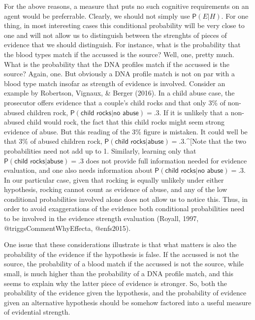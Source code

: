 \documentclass[10pt,dvipsnames,enabledeprecatedfontcommands]{scrartcl}
\newcommand{\pr}[1]{\mathsf{P}(#1)}
\begin{document}
For the above reasons, a measure that puts no such cognitive
requirements on an agent would be preferrable. Clearly, we should not
simply use \(\pr{E\vert H}\). For one thing, in most interesting cases
this conditional probability will be very close to one and will not
allow us to distinguish between the strenghts of pieces of evidence that
we should distinguish. For instance, what is the probability that the
blood types match if the accussed is the source? Well, one, pretty much.
What is the probability that the DNA profiles match if the accussed is
the source? Again, one. But obviously a DNA profile match is not on par
with a blood type match insofar as strength of evidence is involved.
Consider an example by Robertson, Vignaux, \& Berger (2016). In a child
abuse case, the prosecutor offers evidence that a couple's child rocks
and that only 3\% of non-abused children rock,
\(\pr{\textsf{child rocks} \vert \textsf{no abuse}}=.3\). If it is
unlikely that a non-abused child would rock, the fact that this child
rocks might seem strong evidence of abuse. But this reading of the 3\%
figure is mistaken. It could well be that 3\% of abused children rock,
\(\pr{\textsf{child rocks} \vert \textsf{abuse}}=.3\).\^{}{[}Note that
the two probabilities need not add up to 1. Similarly, learning only
that \(\pr{\textsf{child rocks} \vert \textsf{abuse}}=.3\) does not
provide full information needed for evidence evaluation, and one also
needs information about
\(\pr{\textsf{child rocks} \vert \textsf{no abuse}}=.3\). In our
particular case, given that rocking is equally unlikely under either
hypothesis, rocking cannot count as evidence of abuse, and any of the
low conditional probabilities involved alone does not allow us to notice
this. Thus, in order to avoid exaggerations of the evidence both
conditional probabilities need to be involved in the evidence strength
evaluation (Royall, 1997, @triggsCommentWhyEffecta, @enfs2015).

One issue that these considerations illustrate is that what matters is
also the probability of the evidence if the hypothesis is false. If the
accussed is not the source, the probability of a blood match if the
accussed is not the source, while small, is much higher than the
probability of a DNA profile match, and this seems to explain why the
latter piece of evidence is stronger. So, both the probability of the
evidence given the hypothesis, and the probability of evidence given an
alternative hypothesis should be somehow factored into a useful measure
of evidential strength.
\end{document}
